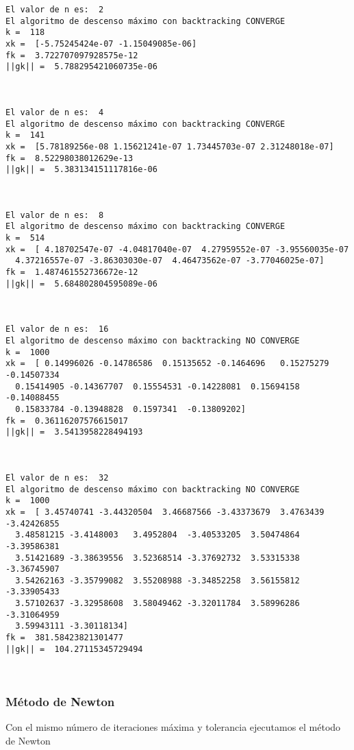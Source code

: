 \documentclass[11pt]{article}
\begin{document}
    \begin{Verbatim}[commandchars=\\\{\}]
El valor de n es:  2
El algoritmo de descenso máximo con backtracking CONVERGE
k =  118
xk =  [-5.75245424e-07 -1.15049085e-06]
fk =  3.722707097928575e-12
||gk|| =  5.788295421060735e-06



El valor de n es:  4
El algoritmo de descenso máximo con backtracking CONVERGE
k =  141
xk =  [5.78189256e-08 1.15621241e-07 1.73445703e-07 2.31248018e-07]
fk =  8.52298038012629e-13
||gk|| =  5.383134151117816e-06



El valor de n es:  8
El algoritmo de descenso máximo con backtracking CONVERGE
k =  514
xk =  [ 4.18702547e-07 -4.04817040e-07  4.27959552e-07 -3.95560035e-07
  4.37216557e-07 -3.86303030e-07  4.46473562e-07 -3.77046025e-07]
fk =  1.487461552736672e-12
||gk|| =  5.684802804595089e-06



El valor de n es:  16
El algoritmo de descenso máximo con backtracking NO CONVERGE
k =  1000
xk =  [ 0.14996026 -0.14786586  0.15135652 -0.1464696   0.15275279 -0.14507334
  0.15414905 -0.14367707  0.15554531 -0.14228081  0.15694158 -0.14088455
  0.15833784 -0.13948828  0.1597341  -0.13809202]
fk =  0.36116207576615017
||gk|| =  3.5413958228494193



El valor de n es:  32
El algoritmo de descenso máximo con backtracking NO CONVERGE
k =  1000
xk =  [ 3.45740741 -3.44320504  3.46687566 -3.43373679  3.4763439  -3.42426855
  3.48581215 -3.4148003   3.4952804  -3.40533205  3.50474864 -3.39586381
  3.51421689 -3.38639556  3.52368514 -3.37692732  3.53315338 -3.36745907
  3.54262163 -3.35799082  3.55208988 -3.34852258  3.56155812 -3.33905433
  3.57102637 -3.32958608  3.58049462 -3.32011784  3.58996286 -3.31064959
  3.59943111 -3.30118134]
fk =  381.58423821301477
||gk|| =  104.27115345729494



    \end{Verbatim}

    \hypertarget{muxe9todo-de-newton}{%
\subsubsection{Método de Newton}\label{muxe9todo-de-newton}}

Con el mismo número de iteraciones máxima y tolerancia ejecutamos el
método de Newton
\end{document}
